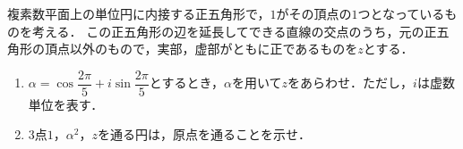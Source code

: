 \documentclass[../../main.tex]{subfiles}
\begin{document}
複素数平面上の単位円に内接する正五角形で，$1$がその頂点の$1$つとなっているものを考える．
この正五角形の辺を延長してできる直線の交点のうち，元の正五角形の頂点以外のもので，実部，虚部がともに正であるものを$z$とする．
\begin{enumerate}
  \item $\alpha=\cos\dfrac{2\pi}{5}+i\sin\dfrac{2\pi}{5}$とするとき，$\alpha$を用いて$z$をあらわせ．ただし，$i$は虚数単位を表す．
  \item $3$点$1$，$\alpha^2$，$z$を通る円は，原点を通ることを示せ．
\end{enumerate}
\end{document}
